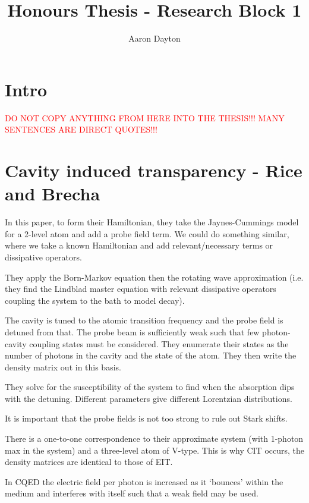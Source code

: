 \documentclass[aps,pra,twocolumn,showpacs,amsmath,amssymb,nofootinbib,longbibliography,superscriptaddress
]{revtex4-1}
\theoremstyle{definition}
\theoremstyle{remark}
\newcommand{\0}{\hat{0}}
\begin{document}
\title{Honours Thesis - Research Block 1}
\author{Aaron Dayton}

\maketitle

\section{Intro}

\textcolor{red}{DO NOT COPY ANYTHING FROM HERE INTO THE THESIS!!! MANY SENTENCES ARE DIRECT QUOTES!!!}

\section{Cavity induced transparency - Rice and Brecha}

In this paper, to form their Hamiltonian, they take the Jaynes-Cummings model for a 2-level atom and add a probe field term. We could do something similar, where we take a known Hamiltonian and add relevant/necessary terms or dissipative operators.

They apply the Born-Markov equation then the rotating wave approximation (i.e. they find the Lindblad master equation with relevant dissipative operators coupling the system to the bath to model decay).

The cavity is tuned to the atomic transition frequency and the probe field is detuned from that. The probe beam is sufficiently weak such that few photon-cavity coupling states must be considered. They enumerate their states as the number of photons in the cavity and the state of the atom. They then write the density matrix out in this basis.

They solve for the susceptibility of the system to find when the absorption dips with the detuning. Different parameters give different Lorentzian distributions.

It is important that the probe fields is not too strong to rule out Stark shifts.

There is a one-to-one correspondence to their approximate system (with 1-photon max in the system) and a three-level atom of V-type. This is why CIT occurs, the density matrices are identical to those of EIT.

In CQED the electric field per photon is increased as it `bounces' within the medium and interferes with itself such that a weak field may be used.
\end{document}
